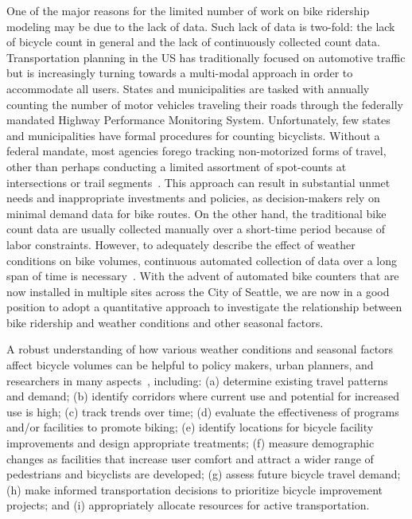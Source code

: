 \documentclass [11pt, proquest] {uwthesis}[2015/03/03]
\begin{document}
One of the major reasons for the limited number of work on bike ridership modeling may be due to the lack of data. Such lack of data is two-fold: the lack of bicycle count in general and the lack of continuously collected count data. Transportation planning in the US has traditionally focused on automotive traffic but is increasingly turning towards a multi-modal approach in order to accommodate all users. States and municipalities are tasked with annually counting the number of motor vehicles traveling their roads through the federally mandated Highway Performance Monitoring System. Unfortunately, few states and municipalities have formal procedures for counting bicyclists. Without a federal mandate, most agencies forego tracking non-motorized forms of travel, other than perhaps conducting a limited assortment of spot-counts at intersections or trail segments~\cite{Kockelman16}. This approach can result in substantial unmet needs and inappropriate investments and policies, as decision-makers rely on minimal demand data for bike routes. On the other hand, the traditional bike count data are usually collected manually over a short-time period because of labor constraints. However, to adequately describe the effect of weather conditions on bike volumes, continuous automated collection of data over a long span of time is necessary~\cite{Miranda-Moreno:2011aa}. With the advent of automated bike counters that are now installed in multiple
sites across the City of Seattle, we are now in a good position to adopt a quantitative approach to investigate the relationship between bike ridership and weather conditions and other seasonal factors.

A robust understanding of how various weather conditions and seasonal factors affect bicycle volumes can be helpful to policy makers, urban planners, and researchers in many aspects~\cite{LAManual}, including: (a) determine existing travel patterns and demand; (b) identify corridors where current use and potential for increased use is high; (c) track trends over time; (d) evaluate the effectiveness of programs and/or facilities to promote biking; (e) identify locations for bicycle facility improvements and design appropriate treatments; (f) measure demographic changes as facilities that increase user comfort and attract a wider range of pedestrians and bicyclists are developed; (g) assess future bicycle travel demand; (h) make informed transportation decisions to prioritize bicycle improvement projects; and (i) appropriately allocate resources for active transportation.
\end{document}
